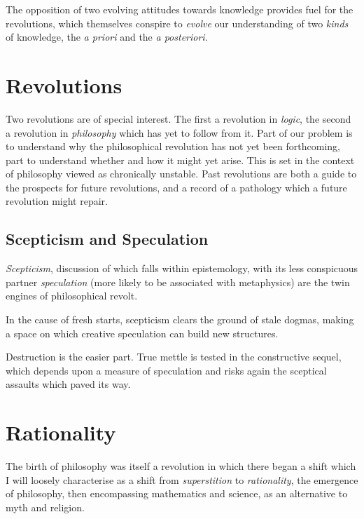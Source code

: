The opposition of two evolving attitudes towards knowledge provides fuel for the revolutions, which themselves conspire to {\it evolve} our understanding of two {\it kinds} of knowledge, the {\it a priori} and the {\it a posteriori}.


\section{Revolutions}

Two revolutions are of special interest.
The first a revolution in {\it logic}, the second a revolution in {\it philosophy} which has yet to follow from it.
Part of our problem is to understand why the philosophical revolution has not yet been forthcoming, part to understand whether and how it might yet arise.
This is set in the context of philosophy viewed as chronically unstable.
Past revolutions are both a guide to the prospects for future revolutions, and a record of a pathology which a future revolution might repair.

\subsection{Scepticism and Speculation}


{\it Scepticism}, discussion of which falls within epistemology, with its less conspicuous partner {\it speculation} (more likely to be associated with metaphysics)  are the twin engines of philosophical revolt.

In the cause of fresh starts, scepticism clears the ground of stale dogmas, making a space on which creative speculation can build new structures.

Destruction is the easier part.
True mettle is tested in the constructive sequel, which depends upon a measure of speculation and risks again the sceptical assaults which paved its way.

\section{Rationality}

The birth of philosophy was itself a revolution in which there began a shift which I will loosely characterise as a shift from {\it superstition} to {\it rationality}, the emergence of philosophy, then encompassing mathematics and science, as an alternative to myth and religion.

